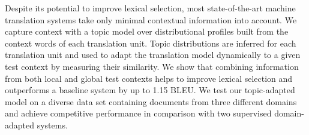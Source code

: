 Despite its potential to improve lexical selection, most state-of-the-art machine translation systems take only minimal contextual information into account. We capture context with a topic model over distributional profiles built from the context words of each translation unit. Topic distributions are inferred for each translation unit and used to adapt the translation model dynamically to a given test context by measuring their similarity. We show that combining information from both local and global test contexts helps to improve lexical selection and outperforms a baseline system by up to 1.15 BLEU. We test our topic-adapted model on a diverse data set containing documents from three different domains and achieve competitive performance in comparison with two supervised domain-adapted systems.
